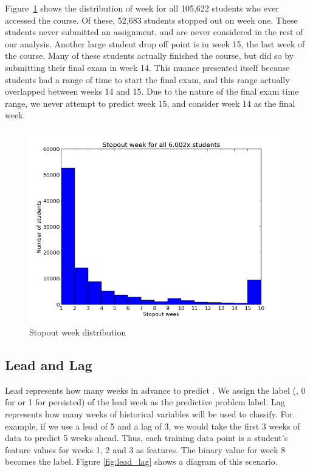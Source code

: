 Figure~\ref{fig:dropout_week} shows the distribution of \sti week for all 105,622 students who ever accessed the course. Of these, 52,683 students stopped out on week one. These students never submitted an assignment, and are never considered in the rest of our analysis. Another large student drop off point is in week 15, the last week of the course. Many of these students actually finished the course, but did so by submitting their final exam in week 14. This nuance presented itself because students had a range of time to start the final exam, and this range actually overlapped between weeks 14 and 15. Due to the nature of the final exam time range, we never attempt to predict week 15, and consider week 14 as the final week.

\begin{figure}[ht!]
  \caption{Stopout week distribution}\label{fig:dropout_week}
  \centering
    \includegraphics[width=1.0\textwidth]{figures/dropout_weeks.png}
\end{figure}

\subsection{Lead and Lag}
Lead represents how many weeks in advance to predict \sti. We assign the \sti label (, 0 for \sti or 1 for persisted) of the lead week as the predictive problem label. Lag represents how many weeks of historical variables will be used to classify. For example, if we use a lead of 5 and a lag of 3, we would take the first 3 weeks of data to predict 5 weeks ahead. Thus, each training data point is a student's feature values for weeks 1, 2 and 3 as features. The binary \sti value for week 8 becomes the label. Figure \ref{fig:lead_lag} shows a diagram of this scenario.


